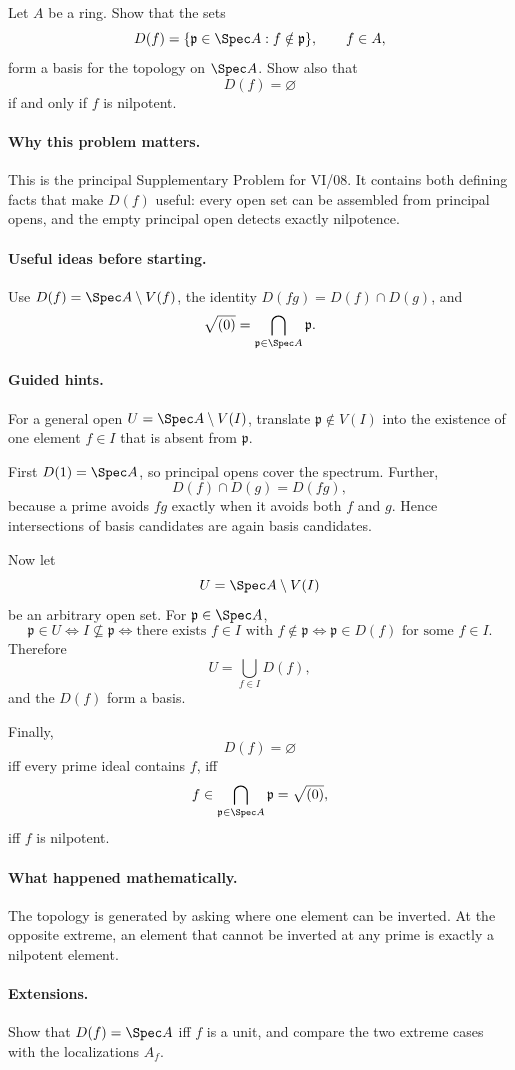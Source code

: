 \begin{problem}
Let $A$ be a ring.  Show that the sets
\[
D(f)=\{\mathfrak p\in\Spec A:f\notin\mathfrak p\},
\qquad f\in A,
\]
form a basis for the topology on $\Spec A$.  Show also that
\[
D(f)=\varnothing
\]
if and only if $f$ is nilpotent.
\end{problem}

\paragraph{Why this problem matters.}
This is the principal Supplementary Problem for VI/08.  It contains both defining facts that make
$D(f)$ useful: every open set can be assembled from principal opens, and the empty principal
open detects exactly nilpotence.

\paragraph{Useful ideas before starting.}
Use $D(f)=\Spec A\setminus V(f)$, the identity $D(fg)=D(f)\cap D(g)$, and
\[
\sqrt{(0)}=\bigcap_{\mathfrak p\in\Spec A}\mathfrak p.
\]

\paragraph{Guided hints.}
For a general open $U=\Spec A\setminus V(I)$, translate
$\mathfrak p\notin V(I)$ into the existence of one element $f\in I$ that is absent from
$\mathfrak p$.

\begin{solution}
First $D(1)=\Spec A$, so principal opens cover the spectrum.  Further,
\[
D(f)\cap D(g)=D(fg),
\]
because a prime avoids $fg$ exactly when it avoids both $f$ and $g$.  Hence intersections
of basis candidates are again basis candidates.

Now let
\[
U=\Spec A\setminus V(I)
\]
be an arbitrary open set.  For $\mathfrak p\in\Spec A$,
\[
\mathfrak p\in U
\iff
I\not\subseteq\mathfrak p
\iff
\text{there exists }f\in I\text{ with }f\notin\mathfrak p
\iff
\mathfrak p\in D(f)\text{ for some }f\in I.
\]
Therefore
\[
U=\bigcup_{f\in I}D(f),
\]
and the $D(f)$ form a basis.

Finally,
\[
D(f)=\varnothing
\]
iff every prime ideal contains $f$, iff
\[
f\in\bigcap_{\mathfrak p\in\Spec A}\mathfrak p=\sqrt{(0)},
\]
iff $f$ is nilpotent.
\end{solution}

\paragraph{What happened mathematically.}
The topology is generated by asking where one element can be inverted.  At the opposite
extreme, an element that cannot be inverted at any prime is exactly a nilpotent element.

\paragraph{Extensions.}
Show that $D(f)=\Spec A$ iff $f$ is a unit, and compare the two extreme cases with the
localizations $A_f$.
